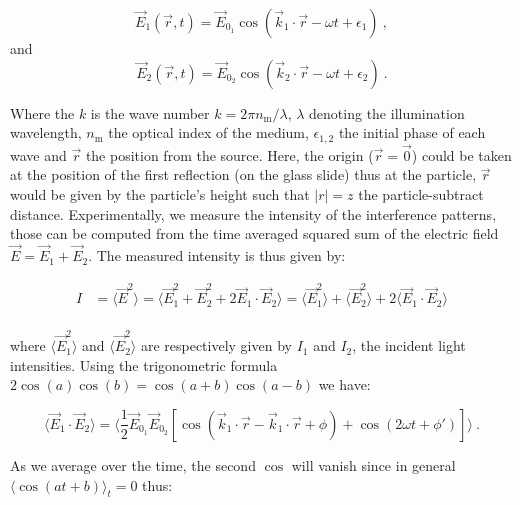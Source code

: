 \begin{equation}
	\vec{E}_1(\vec{r}, t) = \vec{E}_{0_1} \cos(\vec{k}_1 \cdot \vec{r} - \omega t + \epsilon_1) ~,
\end{equation}
and
\begin{equation}
	\vec{E}_2(\vec{r}, t) = \vec{E}_{0_2} \cos (\vec{k}_2 \cdot \vec{r} - \omega t + \epsilon_2) ~.
\end{equation}



Where the $k$ is the wave number $k=2\pi n_{\mathrm{m}}/\lambda$, $\lambda$ denoting the illumination wavelength, $n_\mathrm{m}$ the optical index of the medium, $\epsilon_{1,2}$ the initial phase of each wave and $\vec{r}$ the position from the source. Here, the origin ($\vec{r} = \vec{0}$) could be taken at the position of the first reflection (on the glass slide) thus at the particle, $\vec{r}$ would be given by the particle's height such that $|r| = z$ the particle-subtract distance. Experimentally, we measure the intensity of the interference patterns, those can be computed from the time averaged squared sum of the electric field $\vec{E} = \vec{E}_1 + \vec{E}_2$. The measured intensity is thus given by:

\begin{equation}
	\begin{aligned}
		I & = \langle \vec{E}^2 \rangle = \langle \vec{E}_1^2 + \vec{E}_2^2 + 2\vec{E}_1 \cdot \vec{E}_2 \rangle 
		= \langle \vec{E}_1^2 \rangle + \langle \vec{E}_2^2 \rangle  + 2 \langle \vec{E}_1 \cdot \vec{E}_2 \rangle \\
	\end{aligned}
\end{equation} 

where $ \langle \vec{E}_1^2 \rangle $ and  $\langle \vec{E}_2^2 \rangle$ are respectively given by $I_1$ and $I_2$, the incident light intensities. Using the trigonometric formula $2 \cos (a)\cos (b) = \cos (a+b) \cos (a-b) $ we have:

\begin{equation}
	\langle  
	\vec{E}_1 \cdot \vec{E}_2 \rangle = 
	\langle
	\frac{1}{2} \vec{E}_{0_1}  \vec{E}_{0_2} 
	\left[
		\cos 
		\left(
			\vec{k}_1 \cdot \vec{r} - \vec{k}_1 \cdot \vec{r} + \phi	
		\right)	
		+ 
		\cos
		\left(
			2\omega t + \phi'
		\right)
	\right]
	\rangle~.
\end{equation}

As we average over the time, the second $\cos$ will vanish since in general $\langle \cos(at + b) \rangle_ t = 0$ thus:

